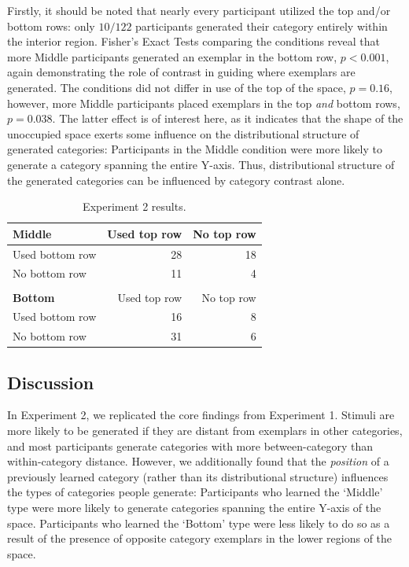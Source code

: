 \documentclass[12pt]{article}
\begin{document}
\begin{flushleft}
Firstly, it should be noted that nearly every participant utilized the top
and/or bottom rows: only $10 / 122$ participants generated their category
entirely within the interior region. Fisher's Exact Tests comparing the
conditions reveal that more Middle participants generated an exemplar in the
bottom row, $p < 0.001$, again demonstrating the role of contrast in guiding
where exemplars are generated. The conditions did not differ in use of the top
of the space, $p = 0.16$, however, more Middle participants placed exemplars in
the top {\em and} bottom rows, $p = 0.038$. The latter effect is of interest
here, as it indicates that the shape of the unoccupied space exerts some
influence on the distributional structure of generated categories: Participants
in the Middle condition were more likely to generate a category spanning the
entire Y-axis. Thus, distributional structure of the generated categories can be
influenced by category contrast alone.

\begin{table}
\begin{center}
\caption{Experiment 2 results.}
\label{table:e2-subset-table} \vskip 0.12in
\begin{tabular}{ l r r} \textbf{Middle} & Used top row & No top row \\ \hline
Used bottom row & 28 & 18 \\ No bottom row & 11 & 4 \\ \\ \textbf{Bottom} & Used
top row & No top row \\ \hline Used bottom row & 16 & 8 \\ No bottom row & 31 &
6 \\
\end{tabular}
\end{center}
\end{table}

\subsection{Discussion}

In Experiment 2, we replicated the core findings from Experiment 1. Stimuli are
more likely to be generated if they are distant from exemplars in other
categories, and most participants generate categories with more between-category
than within-category distance. However, we additionally found that the {\em
position} of a previously learned category (rather than its distributional
structure) influences the types of categories people generate: Participants who
learned the `Middle' type were more likely to generate categories spanning the
entire Y-axis of the space. Participants who learned the `Bottom' type were less
likely to do so as a result of the presence of opposite category exemplars in
the lower regions of the space.


\end{flushleft}
\end{document}
